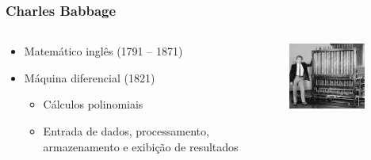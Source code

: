 \documentclass[aspectratio=169,
				xcolor=table]{beamer}
\begin{document}
	\begin{frame}
		\frametitle{Charles Babbage}
		\begin{columns}
			\begin{column}{0.6\textwidth}
				\begin{itemize}
					\item Matemático inglês (1791 – 1871)
					\vspace{1em}
					\item Máquina diferencial (1821)
					\begin{itemize}
						\item Cálculos polinomiais
						\item Entrada de dados, processamento, armazenamento e exibição de resultados
					\end{itemize}
				\end{itemize}
			\end{column}
			\begin{column}{0.4\textwidth}
				\begin{figure}
					\centering
					\includegraphics[width=0.9\textwidth, keepaspectratio]{../figs/cap03/babbage} 		
				\end{figure}
			\end{column}
		\end{columns}
	\end{frame}
	
\end{document}
